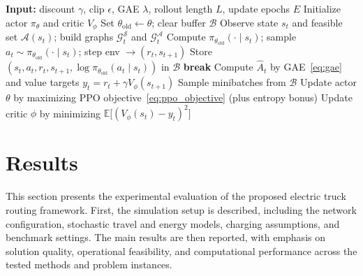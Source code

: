 \documentclass[a4paper,fleqn]{cas-sc}
\begin{document}
\begin{algorithm}[t]
\caption{GraphPPO}
\label{alg:vappo}
\begin{algorithmic}[1]
\State \textbf{Input:} discount $\gamma$, clip $\epsilon$, GAE $\lambda$, rollout length $L$, update epochs $E$
\State Initialize actor $\pi_\theta$ and critic $V_\phi$
    \State Set $\theta_{\mathrm{old}}\leftarrow \theta$; clear buffer $\mathcal{B}$
        \State Observe state $s_t$ and feasible set $\mathcal{A}(s_t)$; build graphs $\mathcal{G}^{\mathcal{S}}_t$ and $\mathcal{G}^{\mathcal{A}}_t$
        \State Compute $\pi_{\theta_{\mathrm{old}}}(\cdot\mid s_t)$; sample $a_t\sim\pi_{\theta_{\mathrm{old}}}(\cdot\mid s_t)$; step env $\rightarrow (r_t,s_{t+1})$
        \State Store $(s_t,a_t,r_t,s_{t+1},\log\pi_{\theta_{\mathrm{old}}}(a_t\mid s_t))$ in $\mathcal{B}$
         \textbf{break} \EndIf
    \EndFor
    \State Compute $\widehat{A}_t$ by GAE~\eqref{eq:gae} and value targets $y_t=r_t+\gamma V_\phi(s_{t+1})$
        \State Sample minibatches from $\mathcal{B}$
        \State Update actor $\theta$ by maximizing PPO objective~\eqref{eq:ppo_objective} (plus entropy bonus)
        \State Update critic $\phi$ by minimizing $\mathbb{E}\big[(V_\phi(s_t)-y_t)^2\big]$
    \EndFor
\EndFor
\end{algorithmic}
\end{algorithm}








\section{Results}

This section presents the experimental evaluation of the proposed electric truck routing framework. First, the simulation setup is described, including the network configuration, stochastic travel and energy models, charging assumptions, and benchmark settings. The main results are then reported, with emphasis on solution quality, operational feasibility, and computational performance across the tested methods and problem instances.
\end{document}
